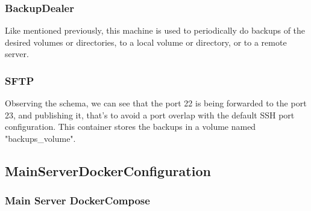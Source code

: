    \subsubsection[Backup\_dealer]{BackupDealer}
    \begin{flushleft}
       Like mentioned previously, this machine is used to periodically do backups of the desired volumes or directories,
       to a local volume or directory, or to a remote server.
    \end{flushleft}

    \subsubsection[SFTP]{SFTP}
    \begin{flushleft}
        Observing the schema, we can see that the port 22 is being forwarded to the port 23, and publishing it, that's
        to avoid a port overlap with the default SSH port configuration.
        This container stores the backups in a volume named "backups\_volume".
    \end{flushleft}

    \newpage
    \subsection[Main Server Docker Configuration]{MainServerDockerConfiguration}\label{subsec:mainserverdockerconfiguration}
    \subsubsection[Main Server Docker-Compose]{Main Server DockerCompose}
    

